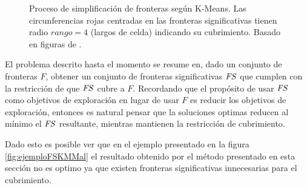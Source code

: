 \begin{figure}[H]
  \caption[Proceso de simplificación de fronteras según K-Means.]{Proceso de
    simplificación de fronteras según K-Means. Las circunferencias rojas
    centradas en las fronteras significativas tienen radio $rango=4$ (largos de celda) indicando su
    cubrimiento. Basado en figuras de \cite{Amorin2019}.}\label{fig:ejemploFrontSig}
\end{figure}


El problema descrito hasta el momento se resume en, dado un conjunto de
fronteras $F$, obtener un conjunto de fronteras significativas $\mathit{FS}$ que
cumplen con la restricción de que $\mathit{FS}$ cubre a $F$. Recordando que el
propósito de usar $\mathit{FS}$ como objetivos de exploración en lugar de usar $F$
es reducir los objetivos de exploración, entonces es natural pensar que la
soluciones optimas reducen al mínimo el $\mathit{FS}$ resultante, mientras
mantienen la restricción de cubrimiento.


Dado esto es posible ver que en el ejemplo presentado en la figura
\ref{fig:ejemploFSKMMal} el resultado obtenido por el método presentado en esta
sección no es optimo ya que existen fronteras significativas innecesarias para
el cubrimiento. 

